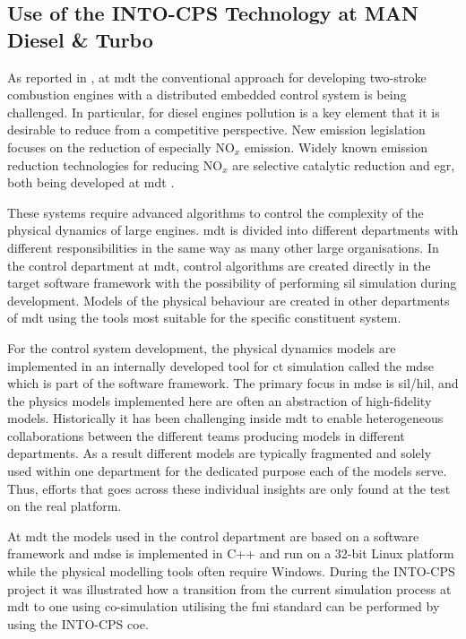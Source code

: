 \subsection{Use of the INTO-CPS Technology at MAN Diesel \& Turbo}

As reported in \cite{Pedersen&17}, at \ac{mdt} the conventional approach for
developing two-stroke combustion engines with a distributed embedded control
system is being challenged. In particular, for diesel engines pollution is a
key element that it is desirable to reduce from a competitive perspective. New
emission legislation focuses on the reduction of especially NO$_x$ emission.
Widely known emission reduction technologies for reducing NO$_x$ are selective
catalytic reduction and \ac{egr}, both being developed at \ac{mdt}
\cite{Pedersen&17}.

These systems require advanced algorithms to control the complexity of the
physical dynamics of large engines. \ac{mdt} is divided into different
departments with different responsibilities in the same way as many other large
organisations. In the control department at \ac{mdt}, control algorithms are
created directly in the target software framework with the possibility of
performing \ac{sil} simulation during development.  Models of the physical
behaviour are created in other departments of \ac{mdt} using the tools most
suitable for the specific constituent system.

For the control system development, the physical dynamics models are
implemented in an internally developed tool for \ac{ct} simulation called the
\ac{mdse} which is part of the software framework. The primary focus in
\ac{mdse} is \ac{sil}/\ac{hil}, and the physics models implemented here are
often an abstraction of high-fidelity models. Historically it has been
challenging inside \ac{mdt} to enable heterogeneous collaborations between the
different teams producing models in different departments. As a result
different models are typically fragmented and solely used within one department
for the dedicated purpose each of the models serve. Thus, efforts that goes
across these individual insights are only found at the test on the real
platform.


At \ac{mdt} the models used in the control department are based on a software
framework and \ac{mdse} is implemented in C++ and run on a 32-bit Linux
platform while the physical modelling tools often require Windows. During the
INTO-CPS project it was illustrated how a transition from the current
simulation process at \ac{mdt} to one using co-simulation utilising the
\ac{fmi} standard can be performed by using the INTO-CPS  \ac{coe}.

